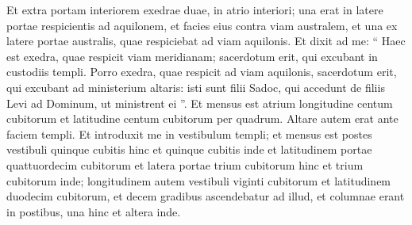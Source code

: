 \begin{biblechapter}
\begin{biblechapter}
\begin{biblechapter}
\begin{biblechapter}
\begin{biblechapter}
\begin{biblechapter}
\begin{biblechapter}
\begin{biblechapter}
\begin{biblechapter}
\begin{biblechapter}
\begin{biblechapter}
\begin{biblechapter}
\begin{biblechapter}
\begin{biblechapter}
\begin{biblechapter}
\begin{biblechapter}
\begin{biblechapter}
\begin{biblechapter}
\begin{biblechapter}
\begin{biblechapter}
\begin{biblechapter}
\begin{biblechapter}
\begin{biblechapter}
\begin{biblechapter}
\begin{biblechapter}
\begin{biblechapter}
\begin{biblechapter}
\begin{biblechapter}
\begin{biblechapter}
\begin{biblechapter}
\begin{biblechapter}
\begin{biblechapter}
\begin{biblechapter}
\begin{biblechapter}
\begin{biblechapter}
\begin{biblechapter}
\begin{biblechapter}
\begin{biblechapter}
\begin{biblechapter}
\begin{biblechapter}
\verse Et extra portam interiorem exedrae duae, in atrio interiori; una erat in latere portae respicientis ad aquilonem, et facies eius contra viam australem, et una ex latere portae australis, quae respiciebat ad viam aquilonis. 
\verse Et dixit ad me: “ Haec est exedra, quae respicit viam meridianam; sacerdotum erit, qui excubant in custodiis templi. 
\verse Porro exedra, quae respicit ad viam aquilonis, sacerdotum erit, qui excubant ad ministerium altaris: isti sunt filii Sadoc, qui accedunt de filiis Levi ad Dominum, ut ministrent ei ”.
 \verse Et mensus est atrium longitudine centum cubitorum et latitudine centum cubitorum per quadrum. Altare autem erat ante faciem templi. 
\verse Et introduxit me in vestibulum templi; et mensus est postes vestibuli quinque cubitis hinc et quinque cubitis inde et latitudinem portae quattuordecim cubitorum et latera portae trium cubitorum hinc et trium cubitorum inde; 
\verse longitudinem autem vestibuli viginti cubitorum et latitudinem duodecim cubitorum, et decem gradibus ascendebatur ad illud, et columnae erant in postibus, una hinc et altera inde.
 

\end{biblechapter}
\end{biblechapter}
\end{biblechapter}
\end{biblechapter}
\end{biblechapter}
\end{biblechapter}
\end{biblechapter}
\end{biblechapter}
\end{biblechapter}
\end{biblechapter}
\end{biblechapter}
\end{biblechapter}
\end{biblechapter}
\end{biblechapter}
\end{biblechapter}
\end{biblechapter}
\end{biblechapter}
\end{biblechapter}
\end{biblechapter}
\end{biblechapter}
\end{biblechapter}
\end{biblechapter}
\end{biblechapter}
\end{biblechapter}
\end{biblechapter}
\end{biblechapter}
\end{biblechapter}
\end{biblechapter}
\end{biblechapter}
\end{biblechapter}
\end{biblechapter}
\end{biblechapter}
\end{biblechapter}
\end{biblechapter}
\end{biblechapter}
\end{biblechapter}
\end{biblechapter}
\end{biblechapter}
\end{biblechapter}
\end{biblechapter}
